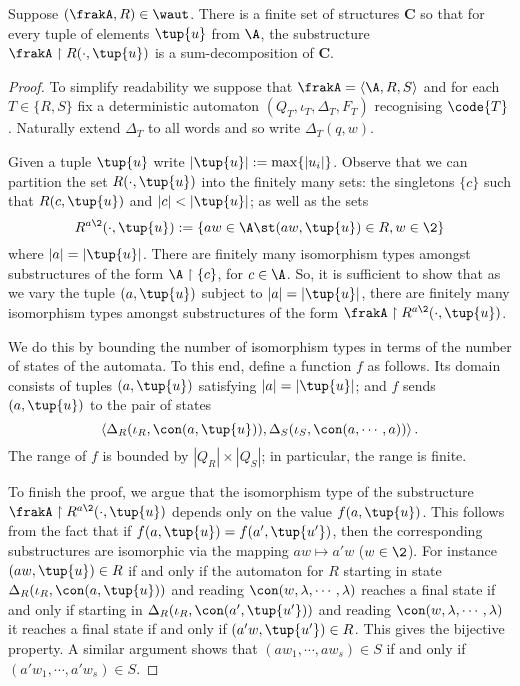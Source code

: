\begin{theorem} \label{thm:sumaug}
Suppose $(\frakA,R) \in \waut$.
There is a finite set of
structures $\mathbf{C}$ so that for every tuple of elements $\tup{u}$ from $\A$, the
substructure ${\frakA} \restriction R(\cdot,\tup{u})$ is a sum-decomposition
of $\mathbf{C}$.
\end{theorem}

\begin{proof}
To simplify readability we suppose that $\frakA = \left<\A, R, S \right>$ and for each $T \in \{R,S\}$ fix a deterministic automaton  $(Q_T,\iota_T,\Delta_T,F_T)$ recognising $\code{T}$.
Naturally extend $\Delta_T$ to all words and so write
$\Delta_T(q,w)$. 


Given a tuple $\tup{u}$ write $|\tup{u}| := \max\{|u_i|\}$. Observe that we can partition the set $R(\cdot,\tup{u})$
into the finitely many sets: the singletons $\{c\}$ such that $R(c,\tup{u})$ and  $|c| <
|\tup{u}|$; as well as the sets 
\[
R^{a \2}(\cdot,\tup{u}) := \{aw \in \A \st (aw,\tup{u}) \in R, w \in \2\}
\]
where $|a| = |\tup{u}|$. There are finitely
many isomorphism types amongst substructures of the form ${\A} \restriction
\{c\}$, for $c \in \A$. So, it is sufficient to show that as we vary the tuple
$(a,\tup{u})$ subject to $|a| = |\tup{u}|$, there are finitely many isomorphism
types amongst substructures of the form $\frakA \restriction R^{a \2}(\cdot,\tup{u})$.

We do this by bounding the number of isomorphism types in terms of the number
of states of the automata. To this end, define a function $f$ as
follows. Its domain consists of tuples $(a,\tup{u})$ satisfying $|a| = |\tup{u}|$; and $f$ sends $(a,\tup{u})$ to the pair of states
$$
\left<
\Delta_R(\iota_R,\con(a,\tup{u})),
\Delta_S(\iota_S,\con(a, \cdots, a) ) \right>.
$$
The range of $f$ is bounded by $|Q_R| \times |Q_S|$; in particular, the range is finite.

To finish the proof, we argue that the isomorphism type of the
substructure $\frakA \restriction R^{a \2}(\cdot,\tup{u})$ depends
only on the value $f(a,\tup{u})$. This follows from the fact that if
$f(a,\tup{u}) = f(a',\tup{u'})$, then the corresponding substructures
are isomorphic via the mapping $aw \mapsto a'w$ ($w \in \2$).
For instance $(aw,\tup{u}) \in R$ if and only if the automaton for $R$ starting in state
$\Delta_R(\iota_R,\con(a,\tup{u}))$ and reading $\con(w,\lambda,\cdots,\lambda)$ reaches
a final state if and only if starting in $\Delta_R(\iota_R,\con(a',\tup{u'}))$ and reading $\con(w,\lambda,\cdots,\lambda)$
it reaches a final state if and only if $(a'w,\tup{u'}) \in R$. This gives the bijective property.
A similar argument shows that $(aw_1,\cdots,aw_s) \in S$ if and only if $(a'w_1,\cdots,a'w_s) \in S$.
\end{proof}


